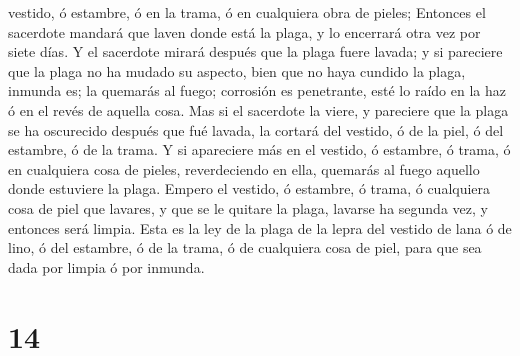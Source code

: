 vestido, ó estambre, ó en la trama, ó en cualquiera obra de pieles;
 Entonces el sacerdote mandará que laven donde está la
plaga, y lo encerrará otra vez por siete días.  Y el
sacerdote mirará después que la plaga fuere lavada; y si pareciere que
la plaga no ha mudado su aspecto, bien que no haya cundido la plaga,
inmunda es; la quemarás al fuego; corrosión es penetrante, esté lo raído
en la haz ó en el revés de aquella cosa.  Mas si el
sacerdote la viere, y pareciere que la plaga se ha oscurecido después
que fué lavada, la cortará del vestido, ó de la piel, ó del estambre, ó
de la trama.  Y si apareciere más en el vestido, ó
estambre, ó trama, ó en cualquiera cosa de pieles, reverdeciendo en
ella, quemarás al fuego aquello donde estuviere la plaga. 
Empero el vestido, ó estambre, ó trama, ó cualquiera cosa de piel que
lavares, y que se le quitare la plaga, lavarse ha segunda vez, y
entonces será limpia.  Esta es la ley de la plaga de la
lepra del vestido de lana ó de lino, ó del estambre, ó de la trama, ó de
cualquiera cosa de piel, para que sea dada por limpia ó por inmunda.

\hypertarget{section-13}{%
\section{14}\label{section-13}}


